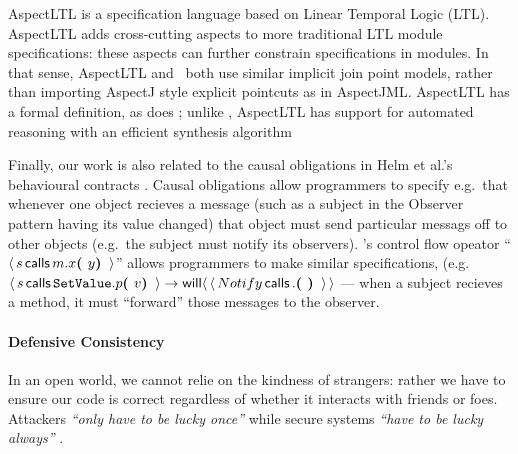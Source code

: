 AspectLTL \cite{AspectLTL} is a specification language based on Linear
Temporal Logic (LTL). AspectLTL adds cross-cutting aspects to more
traditional LTL module specifications: these aspects can further
constrain specifications in modules. In that sense, AspectLTL and
\Chainmail\ both use similar implicit join point models, rather than
importing AspectJ style explicit pointcuts as in AspectJML.  AspectLTL
has a formal definition, as does \Chainmail; unlike \Chainmail,
AspectLTL has support for automated reasoning with an efficient
synthesis algorithm



Finally, our work is also related to the causal obligations in Helm et
al.'s behavioural contracts \cite{helm90}. Causal obligations allow
programmers to specify e.g.\ that whenever one object recieves a
message (such as a subject in the Observer pattern having its value
changed) that object must send particular messags off to other objects
(e.g.\ the subject must notify its observers). \Chainmail's control
flow opeator ``$\Calls{s}{x}{m}{y}$'' allows programmers to make similar
specifications, (e.g. $\Calls{s}{p}{\prg{SetValue}}{v} \rightarrow \Future{\Calls{Notify}{}{}{}}$ --- when a subject recieves a  method,
  it must ``forward'' those messages to the observer.

\paragraph{Defensive Consistency}


In an open world, we cannot relie on the kindness of strangers: rather
we have to ensure our code is correct regardless of whether it
interacts with friends or foes.
Attackers 
\textit{``only have to be lucky once''} while secure systems 
\textit{``have to be lucky always''} \cite{IRAThatcher}.

